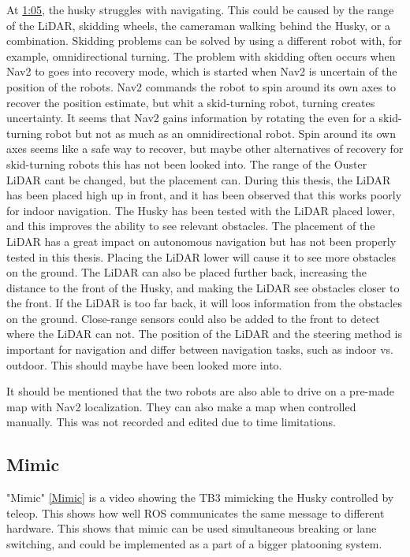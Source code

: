 At \href{https://youtu.be/JiTbKtXq_GY?t=65}{1:05}, the husky struggles with navigating. This could be caused by the range of the LiDAR, skidding wheels, the cameraman walking behind the Husky, or a combination. 
Skidding problems can be solved by using a different robot with, for example, omnidirectional turning. The problem with skidding often occurs when Nav2 to goes into recovery mode, which is started when Nav2 is uncertain of the position of the robots. Nav2 commands the robot to spin around its own axes to recover the position estimate, but whit a skid-turning robot, turning creates uncertainty. It seems that Nav2 gains information by rotating the even for a skid-turning robot but not as much as an omnidirectional robot. Spin around its own axes seems like a safe way to recover, but maybe other alternatives of recovery for skid-turning robots this has not been looked into. 
The range of the Ouster LiDAR cant be changed, but the placement can. During this thesis, the LiDAR has been placed high up in front, and it has been observed that this works poorly for indoor navigation. The Husky has been tested with the LiDAR placed lower, and this improves the ability to see relevant obstacles. The placement of the LiDAR has a great impact on autonomous navigation but has not been properly tested in this thesis. Placing the LiDAR lower will cause it to see more obstacles on the ground. The LiDAR can also be placed further back, increasing the distance to the front of the Husky, and making the LiDAR see obstacles closer to the front. If the LiDAR is too far back, it will loos information from the obstacles on the ground. Close-range sensors could also be added to the front to detect where the LiDAR can not. 
The position of the LiDAR and the steering method is important for navigation and differ between navigation tasks, such as indoor vs. outdoor. This should maybe have been looked more into.

    It should be mentioned that the two robots are also able to drive on a pre-made map with Nav2 localization. They can also make a map when controlled manually. This was not recorded and edited due to time limitations. 
\subsection{Mimic}

"Mimic" \ref{Mimic} is a video showing the TB3 mimicking the Husky controlled by teleop. This shows how well ROS communicates the same message to different hardware. This shows that mimic can be used simultaneous breaking or lane switching, and could be implemented as a part of a bigger platooning system. 

